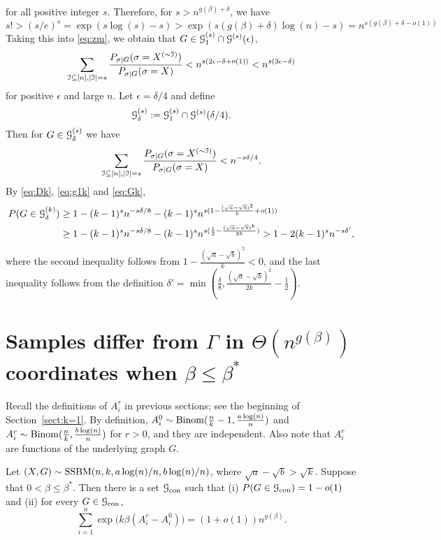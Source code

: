 \documentclass{article}
\begin{document}
for all positive integer $s$.
Therefore, for $s>n^{g(\beta)+\delta}$, we have
$$
s!>(s/e)^s
=\exp(s\log(s)-s)
>\exp(s(g(\beta)+\delta)\log(n)-s)
=n^{s(g(\beta)+\delta-o(1))}
$$
Taking this into \eqref{eq:zm}, we obtain that $G\in\mathcal{G}_1^{(s)}\cap\mathcal{G}^{(s)}(\epsilon)$,
$$
\sum_{\mathcal{I}\subseteq[n],|\mathcal{I}|=s}
\frac{P_{\sigma|G}(\sigma=X^{(\sim \mathcal{I})} )}
{P_{\sigma|G}(\sigma=X)} 
< n^{s(2\epsilon-\delta+o(1))}
< n^{s(3\epsilon-\delta)}
$$
for positive $\epsilon$ and large $n$.
Let $\epsilon=\delta/4$ and define 
$$
\mathcal{G}_{\delta}^{(s)}
:=\mathcal{G}_1^{(s)}\cap\mathcal{G}^{(s)}(\delta/4) .
$$
Then for $G\in\mathcal{G}_{\delta}^{(s)}$ we have
$$
\sum_{\mathcal{I}\subseteq[n],|\mathcal{I}|=s}
\frac{P_{\sigma|G}(\sigma=X^{(\sim \mathcal{I})} )}
{P_{\sigma|G}(\sigma=X)} <
n^{-s \delta /4} .
$$
By \eqref{eq:Dk}, \eqref{eq:g1k} and \eqref{eq:Gk}, 
\begin{align*}
P(G\in\mathcal{G}_{\delta}^{(k)})
& \ge 1-(k-1)^s n^{-s\delta/8}- (k-1)^s n^{s (1-\frac{(\sqrt{a}-\sqrt{b})^2}{k} + o(1) )} \\
& \ge 1-(k-1)^s n^{-s\delta/8}- (k-1)^sn^{s(\frac{1}{2}-\frac{(\sqrt{a}-\sqrt{b})^k}{2k} )}
> 1- 2 (k-1)^s n^{-s\delta'},
\end{align*}
where the second inequality follows from  $1-\frac{(\sqrt{a}-\sqrt{b})^2}{k}< 0$, and the last inequality follows from the definition $\delta'=\min(\frac{\delta}{8},\frac{(\sqrt{a}-\sqrt{b})^2}{2k} - \frac{1}{2})$.
\section{Samples differ from $\Gamma$ in $\Theta(n^{g(\beta)})$ coordinates when $\beta\le\beta^\ast$}  \label{sect:struct}
Recall the definitions of $A^r_i$ in previous sections; see the beginning of Section~\ref{sect:k=1}. 
By definition,
$A^0_i\sim \operatorname{Binom}(\frac{n}{k}-1,\frac{a\log(n)}{n})$ and $A^r_i\sim \operatorname{Binom}(\frac{n}{k}, \frac{b\log(n)}{n})$ for $r>0$, and they are independent. 
Also note that $A^r_i$ are functions of the underlying graph $G$.

\begin{proposition}  \label{prop:con}
Let $(X,G)\sim \operatorname{SSBM}(n,k, a\log(n)/n, b\log(n)/n)$, where $\sqrt{a}-\sqrt{b} > \sqrt{k}$.
Suppose that $0< \beta\le \beta^\ast$.
Then there is a set $\mathcal{G}_{\operatorname{con}}$ such that (i) $P(G \in \mathcal{G}_{\operatorname{con}}) = 1-o(1)$ and (ii) for every $G\in \mathcal{G}_{\operatorname{con}}$, 
$$
\sum_{i=1}^n \exp\big(k\beta (A^r_i-A^0_i) \big)
=(1+o(1)) n^{g(\beta)} .
$$
\end{proposition}
\end{document}

